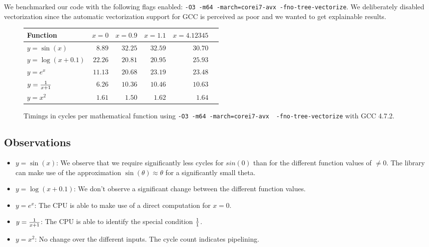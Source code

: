 \documentclass[portrait,a4paper]{article}
\begin{document}
We benchmarked our code with the following flags enabled: \lstinline{-O3 -m64 -march=corei7-avx -fno-tree-vectorize}. We deliberately disabled vectorization since the automatic vectorization support for GCC is perceived as poor and we wanted to get explainable results.
\begin{figure}[H]
    \centering
    \begin{tabular}{l||r|r|r|r|r}
        \textbf{Function} & $x=0$ & $x=0.9$ & $x=1.1$ & $x=4.12345$ \\ \hline
        $y=\sin(x)$     & $8.89$ & $32.25$& $32.59$& $30.70$ \\
        $y=\log(x+0.1)$ & $22.26$ & $20.81$ & $20.95$ & $25.93$\\
        $y=e^x$         & $11.13$ & $20.68$ & $23.19$ & $23.48$\\
        $y={1\over x+1}$& $6.26$ & $10.36$ & $10.46$ & $10.63$\\
        $y=x^2$         & $1.61$  & $1.50$  & $1.62$  & $1.64$
    \end{tabular}
    \caption{Timings in cycles per mathematical function using \lstinline{-O3 -m64 -march=corei7-avx  -fno-tree-vectorize} with GCC 4.7.2.}
\end{figure}

\subsection{Observations}
\begin{itemize}
    \item $y=\sin(x)$: We observe that we require significantly less cycles for $sin(0)$ than for the different function values of $\neq 0$. The library can make use of the approximation $\sin(\theta)\approx \theta$ for a significantly small theta. 
    \item $y=\log(x+0.1)$: We don't observe a significant change between the different function values. 
    \item $y=e^x$: The CPU is able to make use of a direct computation for $x=0$. 
    \item $y={1\over x+1}$: The CPU is able to identify the special condition ${1\over 1}$.
    \item $y=x^2$: No change over the different inputs. The cycle count indicates pipelining.
\end{itemize}
\end{document}
